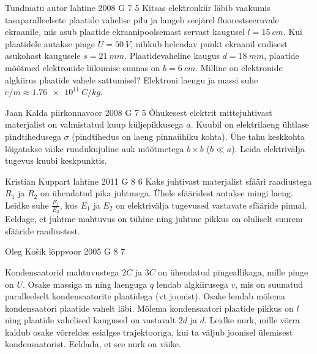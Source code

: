 \documentclass[11pt, twoside]{article}
\begin{document}
{%
{Tundmatu autor} %
{lahtine} %
{2008} %
{G 7} %
{5} %
{
\ifStatement
Kitsas elektronkiir läbib vaakumis tasaparalleelsete plaatide vahelise pilu ja langeb seejärel fluorestseeruvale ekraanile, mis asub plaatide ekraanipoolsemast servast kaugusel $l = \SI{15}{cm}$. Kui plaatidele antakse pinge $U = \SI{50}{V}$, nihkub helendav punkt ekraanil endisest asukohast kaugusele $s = \SI{21}{mm}$. Plaatidevaheline kaugus $d = \SI{18}{mm}$, plaatide mõõtmed elektronide liikumise suunas on $b = \SI{6}{cm}$. Milline on elektronide algkiirus plaatide vahele sattumisel? Elektroni laengu ja massi suhe $e/m \approx \SI{1,76e11}{C/kg}$.
\fi
}

{Jaan Kalda} %
{piirkonnavoor} %
{2008} %
{G 7} %
{5} %
{
\ifStatement
Õhukesest elektrit mittejuhtivast materjalist on valmistatud kuup küljepikkusega $a$. Kuubil on elektrilaeng ühtlase pindtihedusega $\sigma$ (pindtihedus on laeng pinnaühiku kohta). Ühe tahu keskkohta lõigatakse väike ruudukujuline auk mõõtmetega $b \times b$ ($b \ll a$). Leida elektrivälja tugevus kuubi keskpunktis.
\fi
}

{Kristian Kuppart} %
{lahtine} %
{2011} %
{G 8} %
{6} %
{
\ifStatement
Kaks juhtivast materjalist sfääri raadiustega $R_1$ ja $R_2$ on ühendatud pika 
juhtmega. Ühele sfääridest antakse mingi laeng. Leidke suhe $\frac{E_1}{E_2}$, kus
$E_1$ ja $E_2$ on elektrivälja tugevused vastavate sfääride pinnal. Eeldage, et
juhtme mahtuvus on tühine ning juhtme pikkus on oluliselt suurem sfääride
raadiustest.
\fi
}

{Oleg Košik} %
{lõppvoor} %
{2005} %
{G 8} %
{7} %
{
\ifStatement
Kondensaatorid mahtuvustega $2C$ ja $3C$ on ühendatud pingeallikaga, mille pinge on $U$. Osake massiga m ning laenguga $q$ lendab algkiirusega $v$, mis on suunatud paralleelselt kondensaatorite plaatidega (vt joonist). Osake lendab mõlema kondensaatori plaatide vahelt läbi. Mõlema kondensaatori plaatide pikkus on $l$ ning plaatide vahelised kaugused on vastavalt $2d$ ja $d$. Leidke nurk, mille võrra kaldub osake võrreldes esialgse trajektooriga, kui ta väljub joonisel ülemisest kondensaatorist. Eeldada, et see nurk on väike.

}}
\end{document}
